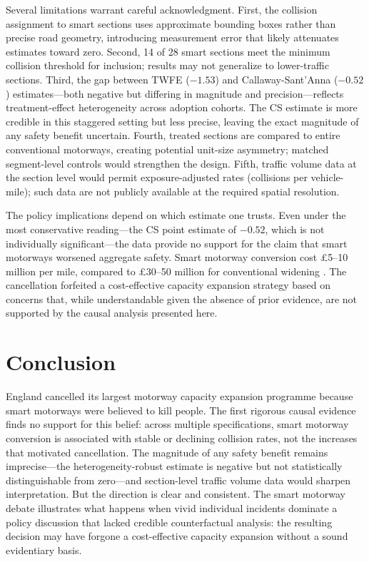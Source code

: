 \documentclass[12pt]{article}
\begin{document}
Several limitations warrant careful acknowledgment. First, the collision assignment to smart sections uses approximate bounding boxes rather than precise road geometry, introducing measurement error that likely attenuates estimates toward zero. Second, 14 of 28 smart sections meet the minimum collision threshold for inclusion; results may not generalize to lower-traffic sections. Third, the gap between TWFE ($-1.53$) and Callaway-Sant'Anna ($-0.52$) estimates---both negative but differing in magnitude and precision---reflects treatment-effect heterogeneity across adoption cohorts. The CS estimate is more credible in this staggered setting but less precise, leaving the exact magnitude of any safety benefit uncertain. Fourth, treated sections are compared to entire conventional motorways, creating potential unit-size asymmetry; matched segment-level controls would strengthen the design. Fifth, traffic volume data at the section level would permit exposure-adjusted rates (collisions per vehicle-mile); such data are not publicly available at the required spatial resolution.

The policy implications depend on which estimate one trusts. Even under the most conservative reading---the CS point estimate of $-0.52$, which is not individually significant---the data provide no support for the claim that smart motorways worsened aggregate safety. Smart motorway conversion cost \pounds 5--10 million per mile, compared to \pounds 30--50 million for conventional widening \citep{national_highways_2023}. The cancellation forfeited a cost-effective capacity expansion strategy based on concerns that, while understandable given the absence of prior evidence, are not supported by the causal analysis presented here.


\section{Conclusion}

England cancelled its largest motorway capacity expansion programme because smart motorways were believed to kill people. The first rigorous causal evidence finds no support for this belief: across multiple specifications, smart motorway conversion is associated with stable or declining collision rates, not the increases that motivated cancellation. The magnitude of any safety benefit remains imprecise---the heterogeneity-robust estimate is negative but not statistically distinguishable from zero---and section-level traffic volume data would sharpen interpretation. But the direction is clear and consistent. The smart motorway debate illustrates what happens when vivid individual incidents dominate a policy discussion that lacked credible counterfactual analysis: the resulting decision may have forgone a cost-effective capacity expansion without a sound evidentiary basis.
\end{document}
